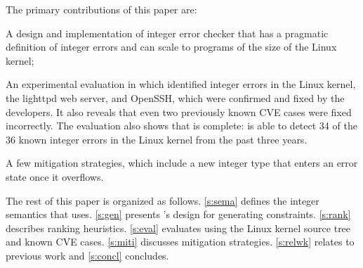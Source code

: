 The primary contributions of this paper are:
\begin{CompactItemize}
\item A design and implementation of integer error checker that has a pragmatic
  definition of integer errors and can scale to programs of the size of the
  Linux kernel;
\item An experimental evaluation in which identified \nrbugs integer errors in
  the Linux kernel, the lighttpd web server, and OpenSSH, which were confirmed
  and fixed by the developers.  It also reveals that even two previously known
  CVE cases were fixed incorrectly.  The evaluation also shows that \sys is
  complete: \sys is able to detect 34 of the 36 known integer errors in the
  Linux kernel from the past three years.
\item A few mitigation strategies, which include a new integer type that enters
  an error state once it overflows.
\end{CompactItemize}

The rest of this paper is organized as follows. \autoref{s:sema}
defines the integer semantics that \sys uses.  \autoref{s:gen}
presents \sys's design for generating constraints.  \autoref{s:rank}
describes ranking heuristics.  \autoref{s:eval} evaluates \sys using
the Linux kernel source tree and known CVE cases.
\autoref{s:miti} discusses mitigation strategies.
\autoref{s:relwk} relates \sys to previous work and \autoref{s:concl}
concludes.
